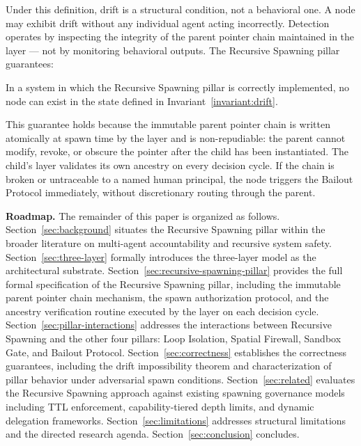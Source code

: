 Under this definition, drift is a structural condition, not a behavioral one. A node may exhibit drift without any individual agent acting incorrectly. Detection operates by inspecting the integrity of the parent pointer chain maintained in the \Fact{} layer — not by monitoring behavioral outputs. The \bxthree{} Recursive Spawning pillar guarantees:

\begin{property}\label{prop:drift-impossibility}
In a \bxthree{} system in which the Recursive Spawning pillar is correctly implemented, no node can exist in the state defined in Invariant~\ref{invariant:drift}.
\end{property}

This guarantee holds because the immutable parent pointer chain is written atomically at spawn time by the \Fact{} layer and is non-repudiable: the parent cannot modify, revoke, or obscure the pointer after the child has been instantiated. The child's \Fact{} layer validates its own ancestry on every decision cycle. If the chain is broken or untraceable to a named human principal, the node triggers the Bailout Protocol immediately, without discretionary routing through the parent.

\textbf{Roadmap.} The remainder of this paper is organized as follows. Section~\ref{sec:background} situates the Recursive Spawning pillar within the broader literature on multi-agent accountability and recursive system safety. Section~\ref{sec:three-layer} formally introduces the \bxthree{} three-layer model as the architectural substrate. Section~\ref{sec:recursive-spawning-pillar} provides the full formal specification of the Recursive Spawning pillar, including the immutable parent pointer chain mechanism, the spawn authorization protocol, and the ancestry verification routine executed by the \Fact{} layer on each decision cycle. Section~\ref{sec:pillar-interactions} addresses the interactions between Recursive Spawning and the other four \bxthree{} pillars: Loop Isolation, Spatial Firewall, Sandbox Gate, and Bailout Protocol. Section~\ref{sec:correctness} establishes the correctness guarantees, including the drift impossibility theorem and characterization of pillar behavior under adversarial spawn conditions. Section~\ref{sec:related} evaluates the Recursive Spawning approach against existing spawning governance models including TTL enforcement, capability-tiered depth limits, and dynamic delegation frameworks. Section~\ref{sec:limitations} addresses structural limitations and the directed research agenda. Section~\ref{sec:conclusion} concludes.
